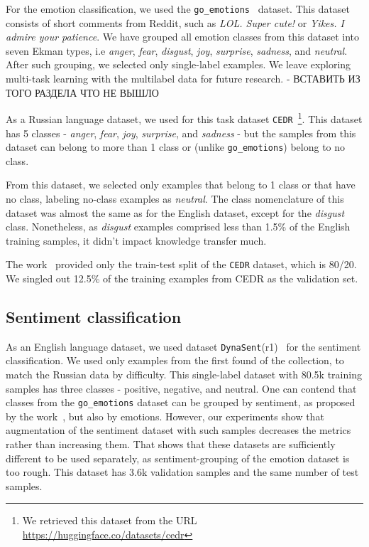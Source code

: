 \begin{itemize}
For the emotion classification, we used the \texttt{go\_emotions}~\cite{emotions} dataset. This dataset consists of short comments from Reddit, such as \textit{LOL. Super cute!} or \textit{Yikes. I admire your patience}. We have grouped all emotion classes from this dataset into seven Ekman types, i.e \textit{anger}, \textit{fear}, \textit{disgust}, \textit{joy}, \textit{surprise}, \textit{sadness}, and \textit{neutral}. After such grouping, we selected only single-label examples. We leave exploring multi-task learning with the multilabel data for future research. - ВСТАВИТЬ ИЗ ТОГО РАЗДЕЛА ЧТО НЕ ВЫШЛО

As a Russian language dataset, we used for this task dataset \texttt{CEDR}~\cite{ru_emotions}\footnote{We retrieved this dataset from the URL \url{https://huggingface.co/datasets/cedr}}. This dataset has 5 classes - \textit{anger}, \textit{fear}, \textit{joy}, \textit{surprise}, and \textit{sadness} - but the samples from this dataset can belong to more than 1 class or (unlike \texttt{go\_emotions}) belong to no class. 

From this dataset, we selected only examples that belong to 1 class or that have no class, labeling no-class examples as \textit{neutral}. The class nomenclature of this dataset was almost the same as for the English dataset, except for the \textit{disgust} class. Nonetheless, as \textit{disgust} examples comprised less than 1.5\% of the English training samples, it didn't impact knowledge transfer much.

The work~\cite{ru_emotions} provided only the train-test split of the \texttt{CEDR} dataset, which is 80/20. We singled out 12.5\% of the training examples from CEDR as the validation set. 

\subsection{Sentiment classification}

As an English language dataset, we used dataset \texttt{DynaSent}(r1)~\cite{sentiment} for the sentiment classification. We used only examples from the first found of the collection, to match the Russian data by difficulty. This single-label dataset with 80.5k training samples has three classes - positive, negative, and neutral. One can contend that classes from the \texttt{go\_emotions} dataset can be grouped by sentiment, as proposed by the work~\cite{emotions}, but also by emotions. However, our experiments show that augmentation of the sentiment dataset with such samples decreases the metrics rather than increasing them. That shows that these datasets are sufficiently different to be used separately, as sentiment-grouping of the emotion dataset is too rough. This dataset has 3.6k validation samples and the same number of test samples. 


\end{itemize}
